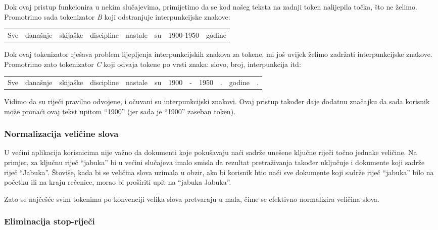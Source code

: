 \documentclass[a4paper,twoside,12pt]{scrreprt}
\newenvironment{nscenter}
 {\par\nopagebreak\centering}
 {\parskip=0pt\par\noindent\ignorespacesafterend}
\begin{document}
Dok ovaj pristup funkcionira u nekim slučajevima, primijetimo da se kod našeg teksta na zadnji token nalijepila točka, što ne želimo. Promotrimo sada tokenizator \textit{B} koji odstranjuje interpunkcijske znakove:

\begin{nscenter}
  \begin{tabular}{|c|c|c|c|c|c|c|c|}
    Sve & današnje & skijaške & discipline & nastale & su & 1900-1950 & godine
  \end{tabular}
\end{nscenter}

Dok ovaj tokenizator rješava problem lijepljenja interpunkcijskih znakova za tokene, mi još uvijek želimo zadržati interpunkcijske znakove. Promotrimo zato tokenizator \textit{C} koji odvaja tokene po vrsti znaka: slovo, broj, interpunkcija itd:

\begin{nscenter}
  \begin{tabular}{|c|c|c|c|c|c|c|c|c|c|c|c|}
    Sve & današnje & skijaške & discipline & nastale & su & 1900 & - & 1950 & . & godine & .
  \end{tabular}
\end{nscenter}

Vidimo da su riječi pravilno odvojene, i očuvani su interpunkcijski znakovi. Ovaj pristup također daje dodatnu značajku da sada korisnik može pronaći ovaj tekst upitom ``1900'' (jer sada je ``1900'' zaseban token).

\subsubsection{Normalizacija veličine slova}

U većini aplikacija korisnicima nije važno da dokumenti koje pokušavaju naći sadrže unešene ključne riječi točno jednake veličine. Na primjer, za ključnu riječ ``jabuka'' bi u većini slučajeva imalo smisla da rezultat pretraživanja također uključuje i dokumente koji sadrže riječ ``Jabuka''. Štoviše, kada bi se veličina slova uzimala u obzir, ako bi korisnik htio naći sve dokumente koji sadrže riječ ``jabuka'' bilo na početku ili na kraju rečenice, morao bi proširiti upit na ``jabuka Jabuka''.

Zato se najčešće svim tokenima po konvenciji velika slova pretvaraju u mala, čime se efektivno normalizira veličina slova.

\subsubsection{Eliminacija stop-riječi}
\end{document}
